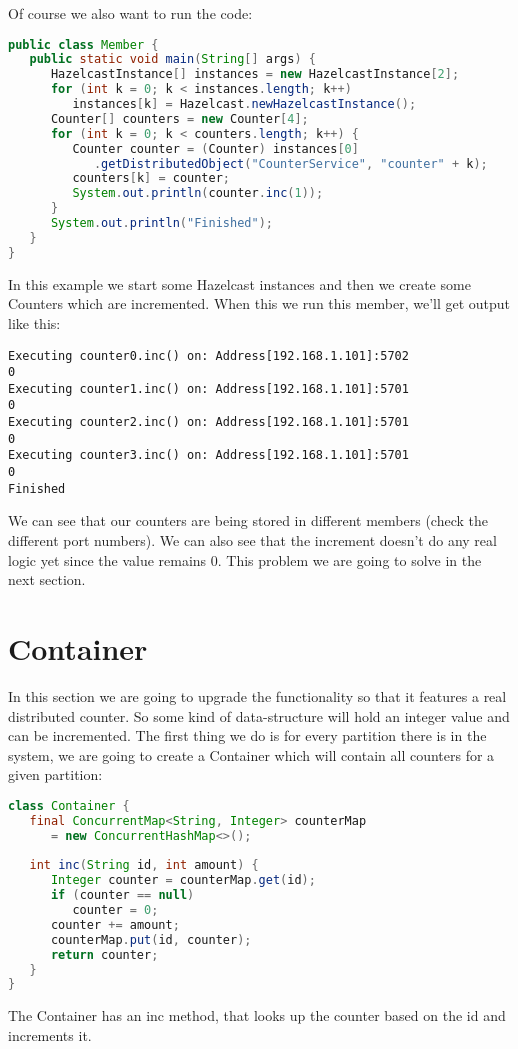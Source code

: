 Of course we also want to run the code:
\begin{lstlisting}[language=java]
public class Member {
   public static void main(String[] args) {
      HazelcastInstance[] instances = new HazelcastInstance[2];
      for (int k = 0; k < instances.length; k++) 
         instances[k] = Hazelcast.newHazelcastInstance();
      Counter[] counters = new Counter[4];
      for (int k = 0; k < counters.length; k++) {
         Counter counter = (Counter) instances[0]
            .getDistributedObject("CounterService", "counter" + k);
         counters[k] = counter;
         System.out.println(counter.inc(1));
      }
      System.out.println("Finished");
   }
}
\end{lstlisting}
In this example we start some Hazelcast instances and then we create  some Counters which are incremented. When this we run this member, we'll get output like this:
\begin{lstlisting}
Executing counter0.inc() on: Address[192.168.1.101]:5702
0
Executing counter1.inc() on: Address[192.168.1.101]:5701
0
Executing counter2.inc() on: Address[192.168.1.101]:5701
0
Executing counter3.inc() on: Address[192.168.1.101]:5701
0
Finished
\end{lstlisting}
We can see that our counters are being stored in different members (check the different port numbers). We can also see that the increment doesn't do any real logic yet since the value remains 0. This problem we are going to solve in the next section.

\section{Container}
In this section we are going to upgrade the functionality so that it features a real distributed counter. So some kind of data-structure will hold an integer value and can be incremented. The first thing we do is for every partition there is in the system, we are going to create a Container which will contain all counters for a given partition:
\begin{lstlisting}[language=java]
class Container {
   final ConcurrentMap<String, Integer> counterMap 
      = new ConcurrentHashMap<>();
   
   int inc(String id, int amount) {
      Integer counter = counterMap.get(id);
      if (counter == null) 
         counter = 0;
      counter += amount;
      counterMap.put(id, counter);
      return counter;
   }
}
\end{lstlisting}
The Container has an inc method, that looks up the counter based on the id and increments it. 

